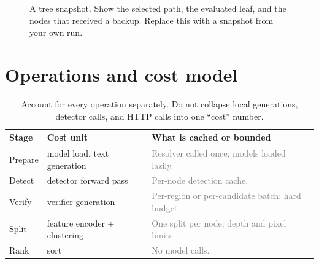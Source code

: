 \documentclass[11pt]{article}
\newcommand{\ph}[1]{\textcolor{gray}{#1}}   %
\begin{document}
\begin{figure}[h]
\centering
{}
\caption{A tree snapshot. Show the selected path, the evaluated leaf, and the
nodes that received a backup. Replace this with a snapshot from your own run.}
\label{fig:tree}
\end{figure}

\section{Operations and cost model}

\begin{table}[h]
\centering
\small
\begin{tabularx}{\textwidth}{@{}l l X@{}}
\toprule
\textbf{Stage} & \textbf{Cost unit} & \textbf{What is cached or bounded} \\
\midrule
Prepare & model load, text generation & \ph{Resolver called once; models loaded lazily.} \\
Detect & detector forward pass & \ph{Per-node detection cache.} \\
Verify & verifier generation & \ph{Per-region or per-candidate batch; hard budget.} \\
Split & feature encoder + clustering & \ph{One split per node; depth and pixel limits.} \\
Rank & sort & \ph{No model calls.} \\
\bottomrule
\end{tabularx}
\caption{Account for every operation separately. Do not collapse local
generations, detector calls, and HTTP calls into one ``cost'' number.}
\label{tab:cost}
\end{table}
\end{document}
